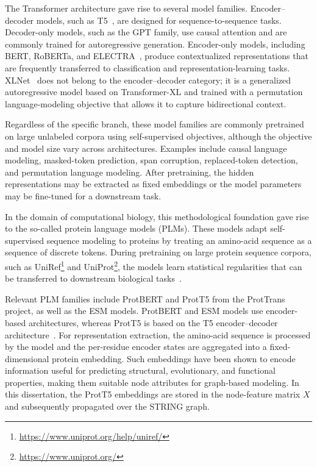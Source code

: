 \documentclass[Ingles]{ic-tese-v3}
\begin{document}
The Transformer architecture gave rise to several model families. Encoder–decoder models, such as T5~\cite{raffel2020exploring}, are designed for sequence-to-sequence tasks. Decoder-only models, such as the GPT family, use causal attention and are commonly trained for autoregressive generation. Encoder-only models, including BERT, RoBERTa, and ELECTRA~\cite{devlin2019bert, liu2019roberta, clark2020electra}, produce contextualized representations that are frequently transferred to classification and representation-learning tasks. XLNet~\cite{yang2019xlnet} does not belong to the encoder–decoder category; it is a generalized autoregressive model based on Transformer-XL and trained with a permutation language-modeling objective that allows it to capture bidirectional context.

Regardless of the specific branch, these model families are commonly pretrained on large unlabeled corpora using self-supervised objectives, although the objective and model size vary across architectures. Examples include causal language modeling, masked-token prediction, span corruption, replaced-token detection, and permutation language modeling. After pretraining, the hidden representations may be extracted as fixed embeddings or the model parameters may be fine-tuned for a downstream task.

In the domain of computational biology, this methodological foundation gave rise to the so-called protein language models (PLMs). These models adapt self-supervised sequence modeling to proteins by treating an amino-acid sequence as a sequence of discrete tokens. During pretraining on large protein sequence corpora, such as UniRef\footnote{\url{https://www.uniprot.org/help/uniref/}} and UniProt\footnote{\url{https://www.uniprot.org/}}, the models learn statistical regularities that can be transferred to downstream biological tasks~\cite{elnaggar2021prottrans}.

Relevant PLM families include ProtBERT and ProtT5 from the ProtTrans project, as well as the ESM models. ProtBERT and ESM models use encoder-based architectures, whereas ProtT5 is based on the T5 encoder–decoder architecture~\cite{elnaggar2021prottrans}. For representation extraction, the amino-acid sequence is processed by the model and the per-residue encoder states are aggregated into a fixed-dimensional protein embedding. Such embeddings have been shown to encode information useful for predicting structural, evolutionary, and functional properties, making them suitable node attributes for graph-based modeling. In this dissertation, the ProtT5 embeddings are stored in the node-feature matrix $X$ and subsequently propagated over the STRING graph.
\end{document}
